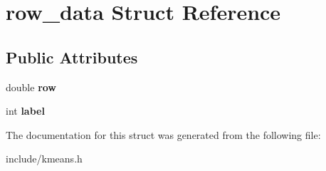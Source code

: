 \hypertarget{structrow__data}{}\section{row\+\_\+data Struct Reference}
\label{structrow__data}
\subsection*{Public Attributes}
\begin{DoxyCompactItemize}
\item 
\hypertarget{structrow__data_ad8f2f35f7df63f710653639dfb6d4ad8}{}double {\bfseries row}\label{structrow__data_ad8f2f35f7df63f710653639dfb6d4ad8}

\item 
\hypertarget{structrow__data_ad9ca787aa08dfb3a1a38bc903068f2ad}{}int {\bfseries label}\label{structrow__data_ad9ca787aa08dfb3a1a38bc903068f2ad}

\end{DoxyCompactItemize}


The documentation for this struct was generated from the following file\+:\begin{DoxyCompactItemize}
\item 
include/kmeans.\+h\end{DoxyCompactItemize}
